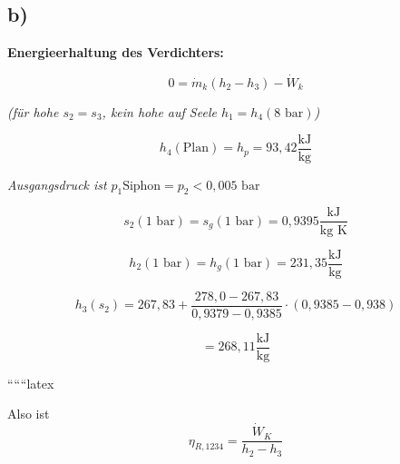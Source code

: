 

\subsection*{b)}

\textbf{Energieerhaltung des Verdichters:}

\[
0 = \dot{m}_k \left( h_2 - h_3 \right) - \dot{W}_k
\]

\textit{(für hohe \( s_2 = s_3 \), kein hohe auf Seele \( h_1 = h_4 (8 \text{ bar}) \))}

\[
h_4 (\text{Plan}) = h_p = 93,42 \frac{\text{kJ}}{\text{kg}}
\]

\textit{Ausgangsdruck ist} \( p_1 \text{Siphon} = p_2 < 0,005 \text{ bar} \)

\[
s_2 (1 \text{ bar}) = s_g (1 \text{ bar}) = 0,9395 \frac{\text{kJ}}{\text{kg K}}
\]

\[
h_2 (1 \text{ bar}) = h_g (1 \text{ bar}) = 231,35 \frac{\text{kJ}}{\text{kg}}
\]

\[
h_3 (s_2) = 267,83 + \frac{278,0 - 267,83}{0,9379 - 0,9385} \cdot (0,9385 - 0,938)
\]

\[
= 268,11 \frac{\text{kJ}}{\text{kg}}
\]

``````latex


Also ist
\[
\eta_{R,1234} = \frac{\dot{W}_K}{h_2 - h_3}
\]